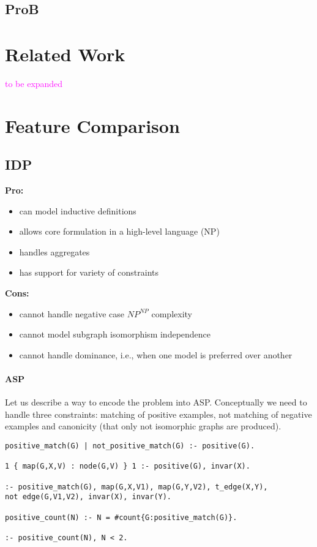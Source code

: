 \documentclass{article}
\theoremstyle{definition}
\newcommand{\sergey}[1]{\textcolor{magenta}{\marginpar{\sc Sergey} #1}}
\begin{document}
\subsection{ProB}

\section{Related Work}
\sergey{to be expanded}


\section{Feature Comparison}

\subsection{IDP} 

\textbf{Pro:}
\begin{itemize}
  \item can model inductive definitions
  \item allows core formulation in a high-level language (NP)
  \item handles aggregates
  \item has support for variety of constraints
\end{itemize}
\textbf{Cons:}
\begin{itemize}
  \item cannot handle negative case $\textit{NP}^\textit{NP}$ complexity
  \item cannot model subgraph isomorphism independence
  \item cannot handle dominance, i.e., when one model is preferred over another 
\end{itemize}

\paragraph{ASP}
Let us describe a way to encode the problem into ASP. Conceptually we need to handle three constraints: matching of positive examples, not matching of negative examples and canonicity (that only not isomorphic graphs are produced).

\lstset{basicstyle=\footnotesize\ttfamily,breaklines=true}
\begin{lstlisting}[caption=ASP positive matching, style=model]
positive_match(G) | not_positive_match(G) :- positive(G).

1 { map(G,X,V) : node(G,V) } 1 :- positive(G), invar(X).

:- positive_match(G), map(G,X,V1), map(G,Y,V2), t_edge(X,Y), 
not edge(G,V1,V2), invar(X), invar(Y).

positive_count(N) :- N = #count{G:positive_match(G)}.

:- positive_count(N), N < 2.
\end{lstlisting}
\end{document}
